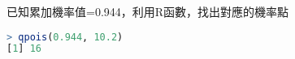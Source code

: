 已知累加機率值=0.944，利用R函數，找出對應的機率點

\begin{lstlisting}[language=R]
> qpois(0.944, 10.2)
[1] 16
\end{lstlisting}